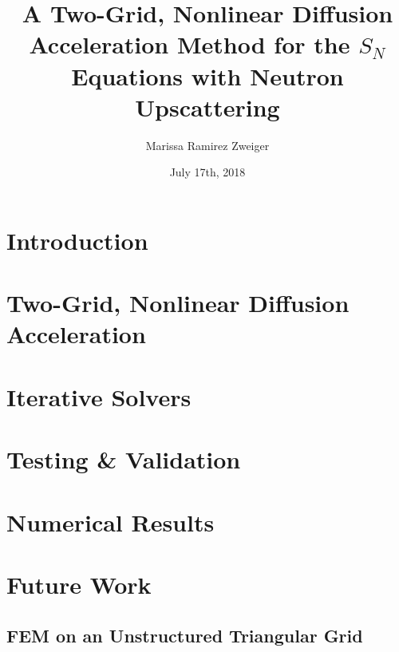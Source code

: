 \documentclass[11pt]{report}
\title{A Two-Grid, Nonlinear Diffusion Acceleration Method for the $S_N$ Equations with Neutron Upscattering}
\author{Marissa Ramirez Zweiger }
\date{July 17th, 2018}
\begin{document}
\maketitle

\tableofcontents

\chapter{Introduction}
\label{sec:intro}


\chapter{Two-Grid, Nonlinear Diffusion Acceleration}
\label{sec:derivation}


\chapter{Iterative Solvers}
\label{sec:iterative}


\chapter{Testing \& Validation}
\label{sec:testing}


\chapter{Numerical Results}
\label{sec:results}


\chapter{Future Work}
\label{sec:future}


\begin{appendices}
  \chapter{FEM on an Unstructured Triangular Grid}
  \label{sec:spatial}
  
\end{appendices}



\end{document}

